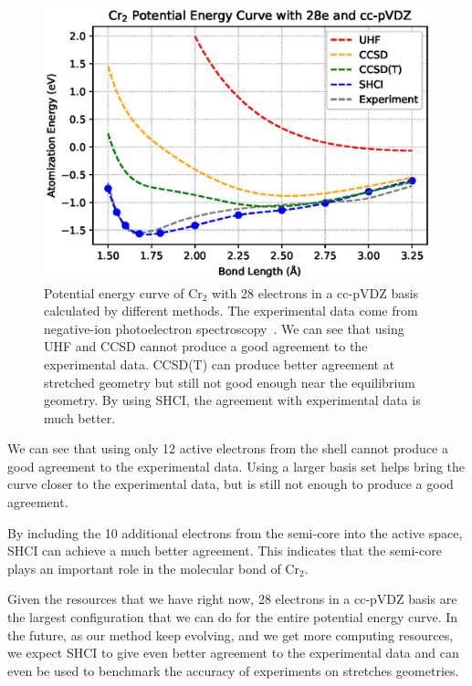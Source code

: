 \begin{figure}
  \begin{center}
  \includegraphics[width=0.9\linewidth]{figs/hfcc.eps}
  \caption{Potential energy curve of Cr$_2$ with 28 electrons in a cc-pVDZ basis calculated by different methods.
  The experimental data come from negative-ion photoelectron spectroscopy~\cite{casey1993negative}.
  We can see that using UHF and CCSD cannot produce a good agreement to the experimental data.
  CCSD(T) can produce better agreement at stretched geometry but still not good enough near the equilibrium geometry.
  By using SHCI, the agreement with experimental data is much better.
}
  \label{fig:cr2curve}
  \end{center}
\end{figure}

We can see that using only 12 active electrons from the shell cannot produce a good agreement to the experimental data.
Using a larger basis set helps bring the curve closer to the experimental data, but is still not enough to produce a good agreement.

By including the 10 additional electrons from the semi-core into the active space, SHCI can achieve a much better agreement.
This indicates that the semi-core plays an important role in the molecular bond of Cr$_2$.

Given the resources that we have right now, 28 electrons in a cc-pVDZ basis are the largest configuration that we can do for the entire potential energy curve.
In the future, as our method keep evolving, and we get more computing resources, we expect SHCI to give even better agreement to the experimental data and can even be used to benchmark the accuracy of experiments on stretches geometries.



